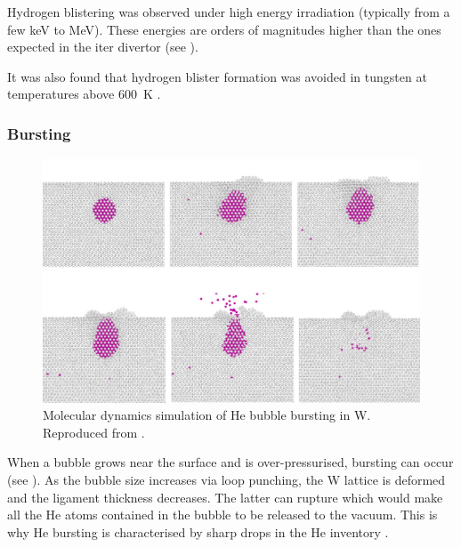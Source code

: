 Hydrogen \gls{blistering} was observed under high energy irradiation (typically from a few \si{keV} to \si{MeV}).
These energies are orders of magnitudes higher than the ones expected in the \acrshort{iter} \gls{divertor} (see ).

It was also found that hydrogen blister formation was avoided in tungsten at temperatures above \SI{600}{K} .

\subsubsection{Bursting}

\begin{figure} [h!]
    \centering
    \includegraphics[width=\linewidth]{Figures/Chapter1/bubble_bursting_zhou.jpg}
    \caption{Molecular dynamics simulation of He bubble bursting in W. Reproduced from \cite{zhou_growth_2019}.}
\end{figure}

When a bubble grows near the surface and is over-pressurised, \gls{bursting} can occur (see ).
As the bubble size increases via \gls{loop punching}, the \gls{W} \gls{lattice} is deformed and the ligament thickness decreases.
The latter can rupture which would make all the \gls{He} atoms contained in the bubble to be released to the vacuum.
This is why \gls{He} \gls{bursting} is characterised by sharp drops in the \gls{He} \gls{inventory} .

